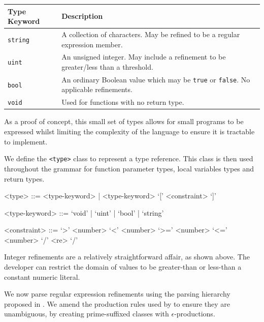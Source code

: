 \documentclass[a4paper,openany,12pt]{book}
\begin{document}
\def\arraystretch{1.5}
\begin{table}[H]

    \centering
    \begin{tabular}[t]{|p{3cm}|p{8cm}|}
        \hline
        \rowcolor{id7-aubergine}
        {\color[HTML]{FFFFFF} \sffamily \textbf{Type Keyword}} & {\color[HTML]{FFFFFF} \sffamily \textbf{Description}} \\ \hline
        \texttt{string} & A collection of characters. May be refined to be a regular expression member. \\ \hline
        \texttt{uint} & An unsigned integer. May include a refinement to be greater/less than a threshold. \\ \hline
        \texttt{bool} & An ordinary Boolean value which may be \texttt{true} or \texttt{false}. No applicable refinements. \\ \hline
        \texttt{void} & Used for functions with no return type. \\ \hline
    \end{tabular}
\end{table}

As a proof of concept, this small set of types allows for small programs to be expressed whilst limiting the complexity
of the language to ensure it is tractable to implement.

We define the \texttt{<type>} class to represent a type reference.
This class is then used throughout the grammar for function parameter types, local variables types and return
types.

\begin{grammar}
    <type> ::= <type-keyword> | <type-keyword> `[' <constraint> `]'

    <type-keyword> ::= `void' | `uint' | `bool' | `string'

    <constraint> ::= `>' <number> \alt `<' <number> \alt `>=' <number> \alt `<=' <number> \alt `/' <re> `/'
\end{grammar}

Integer refinements are a relatively straightforward affair, as shown above.
The developer can restrict the domain of values to be greater-than or less-than a constant numeric literal.

We now parse regular expression refinements using the parsing hierarchy proposed in \citet{cameron1999}.
We amend the production rules used by \citeauthor{cameron1999} to ensure they are unambiguous, by creating
prime-suffixed classes with $\epsilon$-productions.
\end{document}
